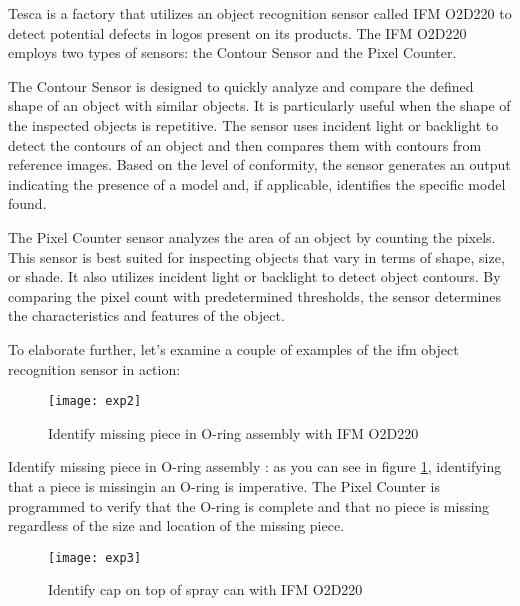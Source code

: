 \FloatBarrier
Tesca is a factory that utilizes an object recognition sensor called IFM O2D220 to detect potential defects in logos present on its products. The IFM O2D220 employs two types of sensors: the Contour Sensor and the Pixel Counter.

The Contour Sensor is designed to quickly analyze and compare the defined shape of an object with similar objects. It is particularly useful when the shape of the inspected objects is repetitive. The sensor uses incident light or backlight to detect the contours of an object and then compares them with contours from reference images. Based on the level of conformity, the sensor generates an output indicating the presence of a model and, if applicable, identifies the specific model found.\cite{Tnd}

The Pixel Counter sensor analyzes the area of an object by counting the pixels. This sensor is best suited for inspecting objects that vary in terms of shape, size, or shade. It also utilizes incident light or backlight to detect object contours. By comparing the pixel count with predetermined thresholds, the sensor determines the characteristics and features of the object.\cite{Tnd}

To elaborate further, let's examine a couple of examples of the ifm object recognition sensor in action:

\FloatBarrier
\begin{figure}[h]

         \centering
        \texttt{[image: exp2]}
   
        \caption{Identify missing piece in O-ring assembly with IFM O2D220}
        \label{fig:exp1}
\FloatBarrier
    \end{figure}

\FloatBarrier
Identify missing piece in O-ring assembly :  as you can see in figure \ref{fig:exp1}, identifying that a piece is missingin an O-ring is imperative. The Pixel Counter is programmed to verify that the O-ring is complete and that no piece is missing regardless of the size and location of the missing piece. \cite{Tnd}
\FloatBarrier
\begin{figure}[h]

         \centering
        \texttt{[image: exp3]}
   
        \caption{Identify cap on top of spray can with IFM O2D220}
        \label{fig:exp2}
\FloatBarrier
    \end{figure}

